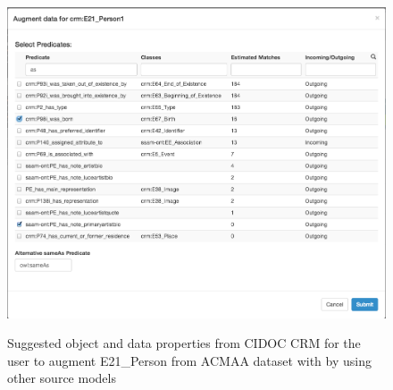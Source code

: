 \begin{figure}
\begin{center}
\includegraphics[width=4.9in]{images/5-search.png}
\vspace{-3mm}
\caption{Suggested object and data properties from CIDOC CRM for the user to augment E21\_Person from ACMAA dataset with by using other source models}
\vspace{-2mm}
\label{fig:search-screenshot}
\end{center}
\vspace{-1.5em}
\end{figure}


